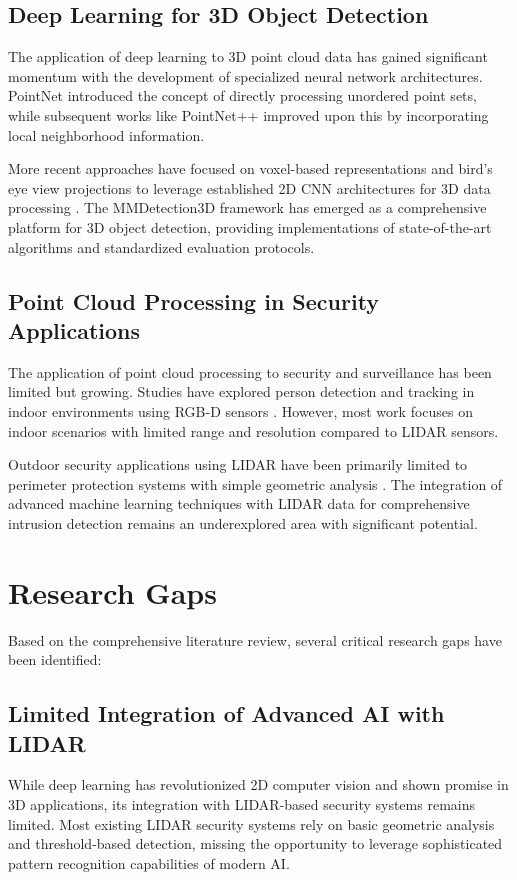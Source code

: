 \documentclass[conference]{IEEEtran}
\begin{document}
\subsection{Deep Learning for 3D Object Detection}
The application of deep learning to 3D point cloud data has gained significant momentum with the development of specialized neural network architectures. PointNet \cite{qi2017pointnet} introduced the concept of directly processing unordered point sets, while subsequent works like PointNet++ \cite{qi2017pointnet++} improved upon this by incorporating local neighborhood information.

More recent approaches have focused on voxel-based representations and bird's eye view projections to leverage established 2D CNN architectures for 3D data processing \cite{zhou2018voxelnet}. The MMDetection3D framework \cite{mmdet3d2020} has emerged as a comprehensive platform for 3D object detection, providing implementations of state-of-the-art algorithms and standardized evaluation protocols.

\subsection{Point Cloud Processing in Security Applications}
The application of point cloud processing to security and surveillance has been limited but growing. Studies have explored person detection and tracking in indoor environments using RGB-D sensors \cite{munaro2014fast}. However, most work focuses on indoor scenarios with limited range and resolution compared to LIDAR sensors.

Outdoor security applications using LIDAR have been primarily limited to perimeter protection systems with simple geometric analysis \cite{wang2019perimeter}. The integration of advanced machine learning techniques with LIDAR data for comprehensive intrusion detection remains an underexplored area with significant potential.

\section{Research Gaps}
Based on the comprehensive literature review, several critical research gaps have been identified:

\subsection{Limited Integration of Advanced AI with LIDAR}
While deep learning has revolutionized 2D computer vision and shown promise in 3D applications, its integration with LIDAR-based security systems remains limited. Most existing LIDAR security systems rely on basic geometric analysis and threshold-based detection, missing the opportunity to leverage sophisticated pattern recognition capabilities of modern AI.
\end{document}
